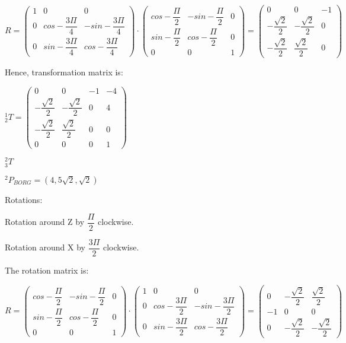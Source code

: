 \documentclass[12pt]{article}
\begin{document}
\begin{list}{)~}{}
$R=\left(\begin{array}{ccc}
1 & 0 & 0 \\
0 & cos -\dfrac{3\Pi}{4} & -sin -\dfrac{3\Pi}{4} \\
0 & sin -\dfrac{3\Pi}{4} & cos -\dfrac{3\Pi}{4} \end{array}\right)\cdot
\left(\begin{array}{ccc}
cos -\dfrac{\Pi}{2} & -sin-\dfrac{\Pi}{2} & 0 \\
sin -\dfrac{\Pi}{2} & cos -\dfrac{\Pi}{2} & 0\\
0 & 0 & 1\end{array}\right)=
\left(\begin{array}{ccc}
0 & 0 & -1 \\
-\dfrac{\sqrt{2}}{2} & -\dfrac{\sqrt{2}}{2} & 0 \\
-\dfrac{\sqrt{2}}{2} & \dfrac{\sqrt{2}}{2} & 0\end{array}\right)$
 
Hence, transformation matrix is:
 
$_{2}^1T = \left(\begin{array}{cccc}
0 & 0 & -1 & -4 \\
-\dfrac{\sqrt{2}}{2} & -\dfrac{\sqrt{2}}{2} & 0 & 4 \\
-\dfrac{\sqrt{2}}{2} & \dfrac{\sqrt{2}}{2} & 0 & 0\\
0 & 0 & 0 & 1\end{array}\right)$

\item
$_{3}^2T$

$^2 P_{BORG} = \left(4, 5\sqrt{2}, \sqrt{2}\right)$

Rotations:
\begin{list}{)~}{}
\item Rotation around Z by $\dfrac{\Pi}{2}$ clockwise.
\item Rotation around X by $\dfrac{3 \Pi}{2}$ clockwise.
\end{list}
 
The rotation matrix is:

$R=\left(\begin{array}{ccc}
cos -\dfrac{\Pi}{2} & -sin -\dfrac{\Pi}{2} & 0 \\
sin -\dfrac{\Pi}{2} & cos -\dfrac{\Pi}{2} & 0\\
0 & 0 & 1\end{array}\right)\cdot 
\left(\begin{array}{ccc}
1 & 0 & 0 \\
0 & cos -\dfrac{3 \Pi}{2} & -sin -\dfrac{3 \Pi}{2}  \\
0 & sin -\dfrac{3 \Pi}{2} & cos -\dfrac{3 \Pi}{2} \end{array}\right)=
\left(\begin{array}{ccc}
0 & -\dfrac{\sqrt{2}}{2} & \dfrac{\sqrt{2}}{2} \\
-1 & 0 & 0 \\
0 & -\dfrac{\sqrt{2}}{2} & -\dfrac{\sqrt{2}}{2}\end{array}\right)$ 
\end{list}
\end{document}
